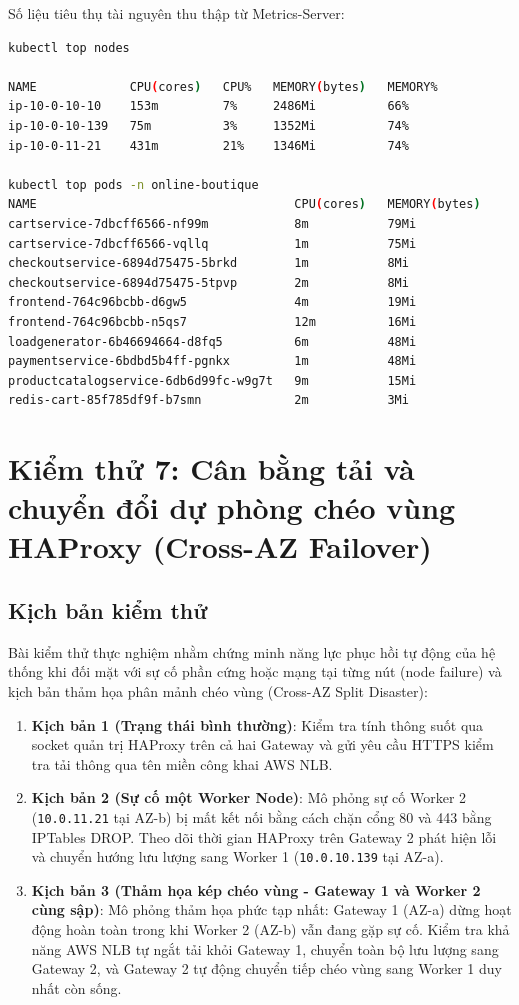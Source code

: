 Số liệu tiêu thụ tài nguyên thu thập từ Metrics-Server:
\begin{lstlisting}[language=bash, caption={Số liệu tài nguyên CPU và RAM trên các node và pods}]
kubectl top nodes

NAME             CPU(cores)   CPU%   MEMORY(bytes)   MEMORY%   
ip-10-0-10-10    153m         7%     2486Mi          66%       
ip-10-0-10-139   75m          3%     1352Mi          74%       
ip-10-0-11-21    431m         21%    1346Mi          74%       

kubectl top pods -n online-boutique
NAME                                    CPU(cores)   MEMORY(bytes)   
cartservice-7dbcff6566-nf99m            8m           79Mi            
cartservice-7dbcff6566-vqllq            1m           75Mi            
checkoutservice-6894d75475-5brkd        1m           8Mi             
checkoutservice-6894d75475-5tpvp        2m           8Mi             
frontend-764c96bcbb-d6gw5               4m           19Mi            
frontend-764c96bcbb-n5qs7               12m          16Mi            
loadgenerator-6b46694664-d8fq5          6m           48Mi            
paymentservice-6bdbd5b4ff-pgnkx         1m           48Mi            
productcatalogservice-6db6d99fc-w9g7t   9m           15Mi            
redis-cart-85f785df9f-b7smn             2m           3Mi             
\end{lstlisting}

\section{Kiểm thử 7: Cân bằng tải và chuyển đổi dự phòng chéo vùng HAProxy (Cross-AZ Failover)}
\subsection{Kịch bản kiểm thử}
Bài kiểm thử thực nghiệm nhằm chứng minh năng lực phục hồi tự động của hệ thống khi đối mặt với sự cố phần cứng hoặc mạng tại từng nút (node failure) và kịch bản thảm họa phân mảnh chéo vùng (Cross-AZ Split Disaster):
\begin{enumerate}
    \item \textbf{Kịch bản 1 (Trạng thái bình thường)}: Kiểm tra tính thông suốt qua socket quản trị HAProxy trên cả hai Gateway và gửi yêu cầu HTTPS kiểm tra tải thông qua tên miền công khai AWS NLB.
    \item \textbf{Kịch bản 2 (Sự cố một Worker Node)}: Mô phỏng sự cố Worker 2 (\texttt{10.0.11.21} tại AZ-b) bị mất kết nối bằng cách chặn cổng 80 và 443 bằng IPTables DROP. Theo dõi thời gian HAProxy trên Gateway 2 phát hiện lỗi và chuyển hướng lưu lượng sang Worker 1 (\texttt{10.0.10.139} tại AZ-a).
    \item \textbf{Kịch bản 3 (Thảm họa kép chéo vùng - Gateway 1 và Worker 2 cùng sập)}: Mô phỏng thảm họa phức tạp nhất: Gateway 1 (AZ-a) dừng hoạt động hoàn toàn trong khi Worker 2 (AZ-b) vẫn đang gặp sự cố. Kiểm tra khả năng AWS NLB tự ngắt tải khỏi Gateway 1, chuyển toàn bộ lưu lượng sang Gateway 2, và Gateway 2 tự động chuyển tiếp chéo vùng sang Worker 1 duy nhất còn sống.
\end{enumerate}

